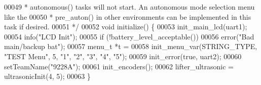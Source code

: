 \begin{DoxyCode}
00049 \textcolor{comment}{ * autonomous() tasks will not start. An autonomous mode selection menu like the}
00050 \textcolor{comment}{ * pre\_auton() in other environments can be implemented in this task if desired.}
00051 \textcolor{comment}{ */}
00052 \textcolor{keywordtype}{void} initialize() \{
00053   init_main_lcd(uart1);
00054   info(\textcolor{stringliteral}{"LCD Init"});
00055   \textcolor{keywordflow}{if} (!battery_level_acceptable())
00056     error(\textcolor{stringliteral}{"Bad main/backup bat"});
00057   menu_t *t =
00058       init_menu_var(STRING_TYPE, \textcolor{stringliteral}{"TEST Menu"}, 5, \textcolor{stringliteral}{"1"}, \textcolor{stringliteral}{"2"}, \textcolor{stringliteral}{"3"}, \textcolor{stringliteral}{"4"}, \textcolor{stringliteral}{"5"});
00059   init_error(\textcolor{keyword}{true}, uart2);
00060   setTeamName(\textcolor{stringliteral}{"9228A"});
00061   init_encoders();
00062   lifter_ultrasonic = ultrasonicInit(4, 5);
00063 \}
\end{DoxyCode}
